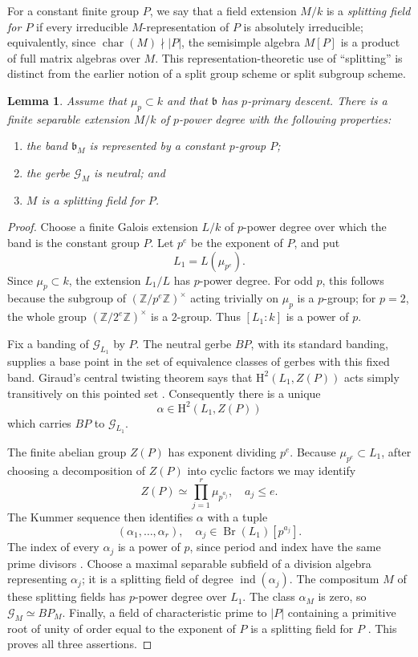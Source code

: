 \documentclass[11pt,reqno]{amsart}
\numberwithin{equation}{section}
\theoremstyle{plain}
\newtheorem{lemm}[prop]{Lemma}
\theoremstyle{definition}
\def\cG{{\mathcal G}}
\def\Br{{\operatorname{Br}}}
\def\ind{{\operatorname{ind}}}
\def\band{{\mathfrak b}}
\def\H{{\mathrm H}}
\begin{document}
For a constant finite group $P$, we say that a field extension $M/k$ is a
\emph{splitting field for $P$} if every irreducible $M$-representation of
$P$ is absolutely irreducible; equivalently, since
$\operatorname{char}(M)\nmid |P|$, the semisimple algebra $M[P]$ is a
product of full matrix algebras over
$M$.  This representation-theoretic use of ``splitting'' is distinct from
the earlier notion of a split group scheme or split subgroup scheme.

\begin{lemm}\label{lem:p-power-neutralization}
Assume that $\mu_p\subset k$ and that $\band$ has $p$-primary
descent.  There is a finite separable extension $M/k$ of $p$-power
degree with the following properties:
\begin{enumerate}[label=\textup{(\roman*)}]
\item the band $\band_M$ is represented by a constant $p$-group $P$;
\item the gerbe $\cG_M$ is neutral; and
\item $M$ is a splitting field for $P$.
\end{enumerate}
\end{lemm}

\begin{proof}
Choose a finite Galois extension $L/k$ of $p$-power degree over which
the band is the constant group $P$.  Let $p^e$ be the exponent of
$P$, and put
\[
L_1=L(\mu_{p^e}).
\]
Since $\mu_p\subset k$, the extension $L_1/L$ has $p$-power degree.
For odd $p$, this follows because the subgroup of
$(\mathbb Z/p^e\mathbb Z)^\times$ acting trivially on $\mu_p$ is a
$p$-group; for $p=2$, the whole group
$(\mathbb Z/2^e\mathbb Z)^\times$ is a $2$-group.  Thus
$[L_1:k]$ is a power of $p$.

Fix a banding of $\cG_{L_1}$ by $P$.  The neutral gerbe $BP$, with
its standard banding, supplies a base point in the set of equivalence
classes of gerbes with this fixed band.  Giraud's central twisting theorem
says that $\H^2(L_1,Z(P))$ acts simply transitively on this pointed set
\cite[Chapter~IV, Theorem~3.3.3(i)]{Giraud}.  Consequently there is a
unique
\[
\alpha\in \H^2(L_1,Z(P))
\]
which carries $BP$ to $\cG_{L_1}$.

The finite abelian group $Z(P)$ has exponent dividing $p^e$.  Because
$\mu_{p^e}\subset L_1$, after choosing a decomposition of $Z(P)$ into
cyclic factors we may identify
\[
Z(P)\simeq\prod_{j=1}^r\mu_{p^{a_j}},
\quad a_j\le e.
\]
The Kummer sequence then identifies $\alpha$ with a tuple
\[
(\alpha_1,\ldots,\alpha_r),
\quad
\alpha_j\in\Br(L_1)[p^{a_j}].
\]
The index of every $\alpha_j$ is a power of $p$, since period and
index have the same prime divisors
\cite[Chapter~4]{GilleSzamuely}.  Choose a maximal separable subfield
of a division algebra representing $\alpha_j$; it is a splitting field
of degree $\ind(\alpha_j)$.  The compositum $M$ of these splitting
fields has $p$-power degree over $L_1$.  The class $\alpha_M$ is
zero, so $\cG_M\simeq BP_M$.  Finally, a field of characteristic prime
to $|P|$ containing a primitive root of unity of order equal to the
exponent of $P$ is a splitting field for $P$
\cite[Chapter~12]{SerreRep}.  This proves all three assertions.
\end{proof}
\end{document}
